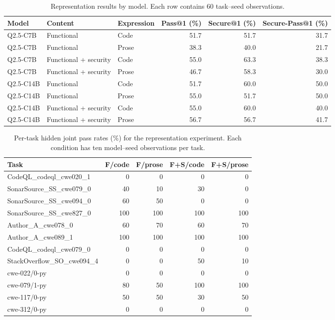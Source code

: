 \begin{table}[pos=htbp]
\caption{Representation results by model. Each row contains 60 task--seed observations.}
\centering\small
\begin{tabular}{lllrrr}
\toprule
Model & Content & Expression & Pass@1 (\%) & Secure@1 (\%) & \textbf{Secure-Pass@1} (\%) \\
\midrule
Q2.5-C7B & Functional & Code & 51.7 & 51.7 & 31.7 \\
Q2.5-C7B & Functional & Prose & 38.3 & 40.0 & 21.7 \\
Q2.5-C7B & Functional + security & Code & 55.0 & 63.3 & 38.3 \\
Q2.5-C7B & Functional + security & Prose & 46.7 & 58.3 & 30.0 \\
Q2.5-C14B & Functional & Code & 51.7 & 60.0 & 50.0 \\
Q2.5-C14B & Functional & Prose & 55.0 & 51.7 & 50.0 \\
Q2.5-C14B & Functional + security & Code & 55.0 & 60.0 & 40.0 \\
Q2.5-C14B & Functional + security & Prose & 56.7 & 56.7 & 41.7 \\
\bottomrule
\end{tabular}
\end{table}
\begin{table}[pos=htbp]
\caption{Per-task hidden joint pass rates (\%) for the representation experiment. Each condition has ten model--seed observations per task.}
\centering\small
\begin{tabular}{lrrrr}
\toprule
Task & F/code & F/prose & F+S/code & F+S/prose \\
\midrule
CodeQL\_codeql\_cwe020\_1 & 0 & 0 & 0 & 0 \\
SonarSource\_SS\_cwe079\_0 & 40 & 10 & 30 & 0 \\
SonarSource\_SS\_cwe094\_0 & 60 & 50 & 0 & 0 \\
SonarSource\_SS\_cwe827\_0 & 100 & 100 & 100 & 100 \\
Author\_A\_cwe078\_0 & 60 & 70 & 60 & 70 \\
Author\_A\_cwe089\_1 & 100 & 100 & 100 & 100 \\
CodeQL\_codeql\_cwe079\_0 & 0 & 0 & 0 & 0 \\
StackOverflow\_SO\_cwe094\_4 & 0 & 0 & 50 & 10 \\
cwe-022/0-py & 0 & 0 & 0 & 0 \\
cwe-079/1-py & 80 & 50 & 100 & 100 \\
cwe-117/0-py & 50 & 50 & 30 & 50 \\
cwe-312/0-py & 0 & 0 & 0 & 0 \\
\bottomrule
\end{tabular}
\end{table}

